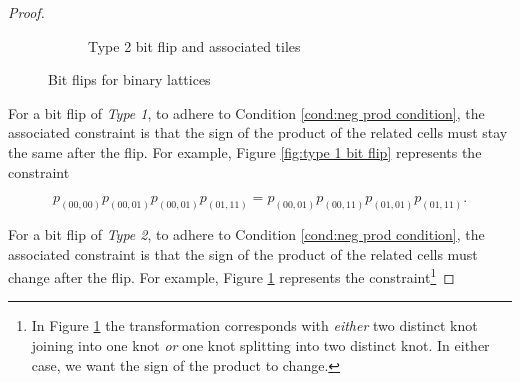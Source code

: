 \documentclass[12pt]{article}
\theoremstyle{plain}
\theoremstyle{definition}
\theoremstyle{remark}
\theoremstyle{definition}
\newcommand{\cell}[4]{ \draw[thick] ( #1 , #2 ) rectangle ( #3 , #4 );}
\newcommand{\cellA}[4]{\draw[red, thick, densely dotted] ( #1 + 0.5 , #2 ) arc(0:90:{0.5}); \draw[thick] ( #1 , #2 ) rectangle ( #3 , #4 );}
\newcommand{\cellB}[4]{\draw[red, thick, densely dotted] ( #1 + 1 , #2 + 0.5 ) arc(90:180:{0.5}); \draw[thick] ( #1 , #2 ) rectangle ( #3 , #4 );}
\newcommand{\cellC}[4]{\draw[red, thick, densely dotted] ( #1 + 0.5, #2 + 1 ) arc(180:270:{0.5}); \draw[thick] ( #1 , #2 ) rectangle ( #3 , #4 );}
\newcommand{\cellD}[4]{\draw[red, thick, densely dotted] ( #1 , #2 + 0.5 ) arc(-90:0:{0.5}); \draw[thick] ( #1 , #2 ) rectangle ( #3 , #4 );}
\newcommand{\cellE}[4]{\draw[red, thick, densely dotted] (#3, #4 * 0.5 + #2 * 0.5) -- (#1, #4 * 0.5 + #2 * 0.5); \draw[thick] ( #1 , #2 ) rectangle ( #3 , #4 );}
\newcommand{\lablnode}[3]{\node[shape=circle,draw=none,fill=none, inner sep=0pt,minimum size=0pt] (A) at ( #1 , #2 ) {#3};}
\newcommand{\lablvertex}[3]{\node[shape=circle,draw=none,fill=white, inner sep=2pt,minimum size=5pt] (A) at ( #1 , #2 ) {#3};}
\begin{document}
\begin{proof}
\begin{figure}[h!]
\begin{center}
\begin{subfigure}{0.4\textwidth}
    \caption{Type 2 bit flip and associated tiles}
    \label{fig:type 2 bit flip}
\end{subfigure}

\end{center}
\caption{Bit flips for binary lattices}
\label{fig:bit flip}
\end{figure}

For a bit flip of \textit{Type 1}, to adhere to Condition \ref{cond:neg prod condition}, the associated constraint is that the sign of the product of the related cells must stay the same after the flip. For example, Figure \ref{fig:type 1 bit flip} represents the constraint

\begin{equation}
    p_{(00,00)}p_{(00,01)}p_{(00,01)}p_{(01,11)} = p_{(00,01)}p_{(00,11)}p_{(01,01)}p_{(01,11)}.
\end{equation}

For a bit flip of \textit{Type 2}, to adhere to Condition \ref{cond:neg prod condition}, the associated constraint is that the sign of the product of the related cells must change after the flip. For example, Figure \ref{fig:type 2 bit flip} represents the constraint\footnote{In Figure \ref{fig:type 2 bit flip} the transformation corresponds with \textit{either} two distinct knot joining into one knot \textit{or} one knot splitting into two distinct knot. In either case, we want the sign of the product to change.}


\end{proof}
\end{document}
